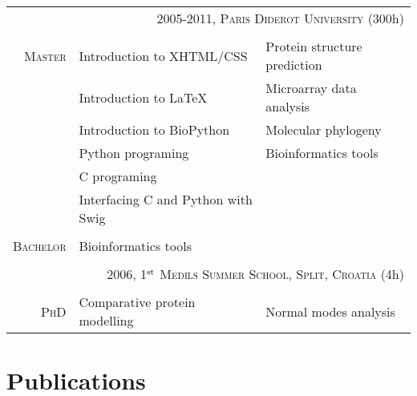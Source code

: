 \documentclass[a4paper,10pt]{article}
\begin{document}
\begin{tabular}{r|p{5.5cm}p{5.5cm}}

  \multicolumn{3}{r}{\large \textsc{2005-2011, Paris Diderot University} (300h)} \\
  \multicolumn{3}{l}{}\\
  \textsc{Master} & Introduction to XHTML/CSS & Protein structure prediction\\
  & Introduction to \LaTeX     & Microarray data analysis\\
  & Introduction to BioPython  & Molecular phylogeny\\
  & Python programing & Bioinformatics tools\\
  & C programing & \\
  & Interfacing C and Python with Swig & \\
  \multicolumn{3}{l}{}\\

  \textsc{Bachelor} & Bioinformatics tools & \\
  \multicolumn{3}{l}{}\\

  \multicolumn{3}{r}{\large \textsc{2006, 1$^{\rm st}$ Medils Summer School, Split, Croatia} (4h)} \\
  \multicolumn{3}{l}{}\\
  \textsc{PhD} & Comparative protein modelling & Normal modes analysis\\

\end{tabular}

\section{Publications}
\nocite{*}
\printbibliography[type=article,heading=subbibliography,title={Peer reviewed articles}]
\printbibliography[type=inproceedings,heading=subbibliography,title={Proceedings}]
\printbibliography[keyword=oral,heading=subbibliography,title={Oral communications}]
\printbibliography[keyword=poster,heading=subbibliography,title={Posters}]



\end{document}
